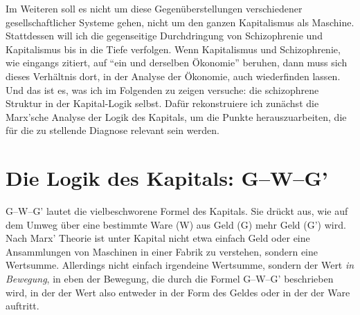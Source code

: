 \documentclass[12pt,
               paper=a4,
               twoside=false,
               onehalfspacing,
               bibliography=totoc,
               toc=graduated,
               ]{scrartcl}
\newcommand{\pc}[2]{\parencite[#1]{#2}}
\newcommand{\worries}[1]{\ifdraft{\textcolor{blue}{\texttt{(#1)}}}{}}
\newcommand{\gwg}{G--W--G'\xspace}
\begin{document}

Im Weiteren soll es nicht um diese Gegenüberstellungen verschiedener
gesellschaftlicher Systeme gehen, nicht um den ganzen Kapitalismus als
Maschine. Stattdessen will ich die gegenseitige Durchdringung von
Schizophrenie und Kapitalismus bis in die Tiefe verfolgen. Wenn
Kapitalismus und Schizophrenie, wie eingangs zitiert, auf "`ein und
derselben Ökonomie"' \pc{315}{ao} beruhen, dann muss sich dieses
Verhältnis dort, in der Analyse der Ökonomie, auch wiederfinden
lassen. Und das ist es, was ich im Folgenden zu zeigen versuche: die
schizophrene Struktur in der Kapital-Logik selbst. Dafür rekonstruiere
ich zunächst die Marx'sche Analyse der Logik des Kapitals, um die
Punkte herauszuarbeiten, die für die zu stellende Diagnose relevant
sein werden.


%
%
%
%



\section{Die Logik des Kapitals: \gwg}
\label{gwg}

\gwg lautet die vielbeschworene Formel des Kapitals. Sie drückt aus,
wie auf dem Umweg über eine bestimmte Ware (W) aus Geld (G) mehr Geld
(G') wird. Nach Marx' Theorie ist unter Kapital nicht etwa einfach
Geld oder eine Ansammlungen von Maschinen in einer Fabrik zu
verstehen, sondern eine Wertsumme. Allerdings nicht einfach irgendeine
Wertsumme, sondern der Wert \emph{in Bewegung}, in eben der Bewegung,
die durch die Formel \gwg beschrieben wird, in der der Wert also
entweder in der Form des Geldes oder in der der Ware auftritt.
\end{document}
